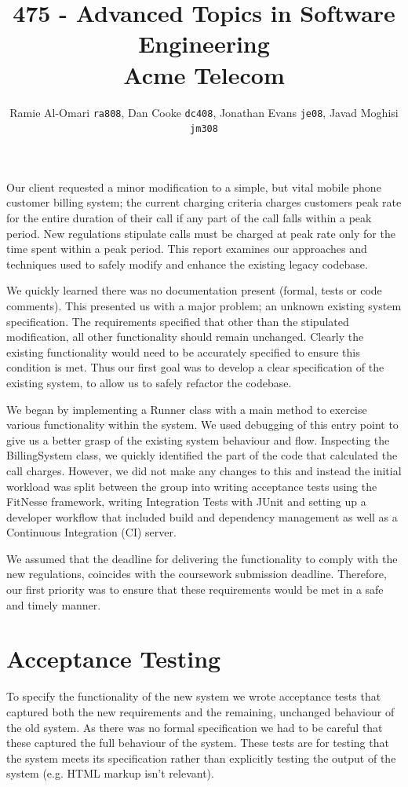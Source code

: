 \documentclass[a4paper,11pt]{article}
\title{475 - Advanced Topics in Software Engineering \\ Acme Telecom}
\author{Ramie Al-Omari \texttt{ra808}, Dan Cooke \texttt{dc408}, Jonathan Evans \texttt{je08}, Javad Moghisi \texttt{jm308}}
\begin{document}
\maketitle

Our client requested a minor modification to a simple, but vital mobile phone customer billing system; the current charging criteria charges customers peak rate for the entire duration of their call if any part of the call falls within a peak period. New regulations stipulate calls must be charged at peak rate only for the time spent within a peak period. This report examines our approaches and techniques used to safely modify and enhance the existing legacy codebase.

We quickly learned there was no documentation present (formal, tests or code comments). This presented us with a major problem; an unknown existing system specification. The requirements specified that other than the stipulated modification, all other functionality should remain unchanged. Clearly the existing functionality would need to be accurately specified to ensure this condition is met. Thus our first goal was to develop a clear specification of the existing system, to allow us to safely refactor the codebase.

We began by implementing a Runner class with a main method to exercise various functionality within the system. We used debugging of this entry point to give us a better grasp of the existing system behaviour and flow. Inspecting the BillingSystem class, we quickly identified the part of the code that calculated the call charges. However, we did not make any changes to this and instead the initial workload was split between the group into writing acceptance tests using the FitNesse framework, writing Integration Tests with JUnit and setting up a developer workflow that included build and dependency management as well as a Continuous Integration (CI) server.

We assumed that the deadline for delivering the functionality to comply with the new regulations, coincides with the coursework submission deadline. Therefore, our first priority was to ensure that these requirements would be met in a safe and timely manner.


\section{Acceptance Testing}
To specify the functionality of the new system we wrote acceptance tests that captured both the new requirements and the remaining, unchanged behaviour of the old system. As there was no formal specification we had to be careful that these captured the full behaviour of the system. These tests are for testing that the system meets its specification rather than explicitly testing the output of the system (e.g. HTML markup isn't relevant).
\end{document}
